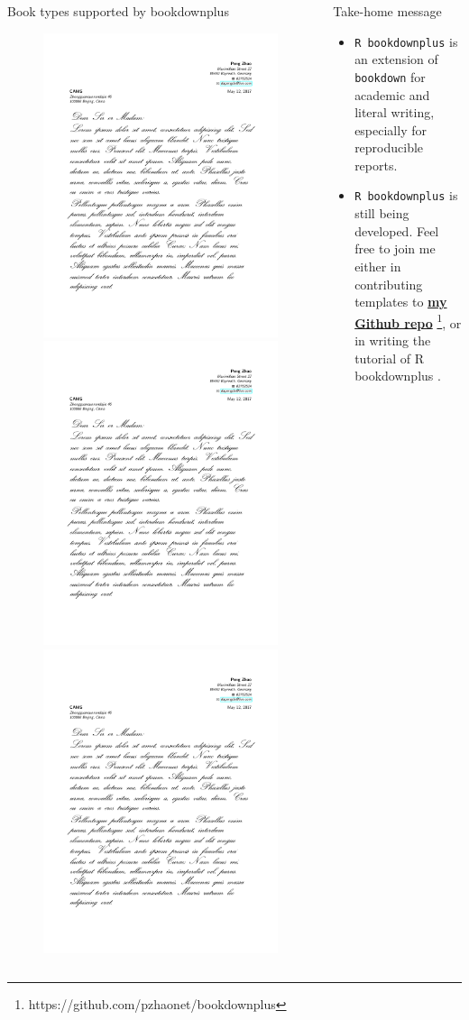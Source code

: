 \documentclass[english,xcolor=table,t
]{beamer}
\begin{document}
\begin{frame}
\begin{columns}
\begin{block}{Book types supported by bookdownplus}
\begin{figure}[htp]
  \includegraphics[width=.33\textwidth]{images/mail.pdf}\hfill
  \includegraphics[width=.33\textwidth]{images/mail.pdf}\hfill
  \includegraphics[width=.33\textwidth]{images/mail.pdf}
\end{figure}

\end{block}

\begin{block}{Take-home message}

\begin{itemize}
\item
  \texttt{R\ bookdownplus} is an extension of \texttt{bookdown} for
  academic and literal writing, especially for reproducible reports.
\item
  \texttt{R\ bookdownplus} is still being developed. Feel free to join
  me either in contributing templates to
  \href{https://github.com/pzhaonet/bookdownplus}{\textbf{my Github
  repo}} \footnote{https://github.com/pzhaonet/bookdownplus}, or in
  writing the tutorial of R bookdownplus \autocite{R-bdp}.
\end{itemize}


\end{block}
\end{columns}
\end{frame}
\end{document}
